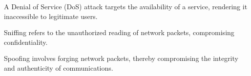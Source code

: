 \begin{definition}
    A Denial of Service (DoS) attack targets the availability of a service, rendering it inaccessible to legitimate users.
\end{definition}
\begin{definition}
    Sniffing refers to the unauthorized reading of network packets, compromising confidentiality.
\end{definition}
\begin{definition}
    Spoofing involves forging network packets, thereby compromising the integrity and authenticity of communications.
\end{definition}